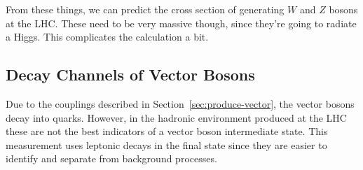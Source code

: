 From these things, we can predict the cross section of generating $W$ and $Z$ bosons at the LHC.
These need to be very massive though, since they're going to radiate a Higgs.
This complicates the calculation a bit.


\subsection{Decay Channels of Vector Bosons} \label{sec:v-decay}

Due to the couplings described in Section~\ref{sec:produce-vector},
the vector bosons decay into quarks.
However, in the hadronic environment produced at the LHC
these are not the best indicators of a vector boson intermediate state.
This measurement uses leptonic decays in the final state
since they are easier to identify and separate from background processes.

